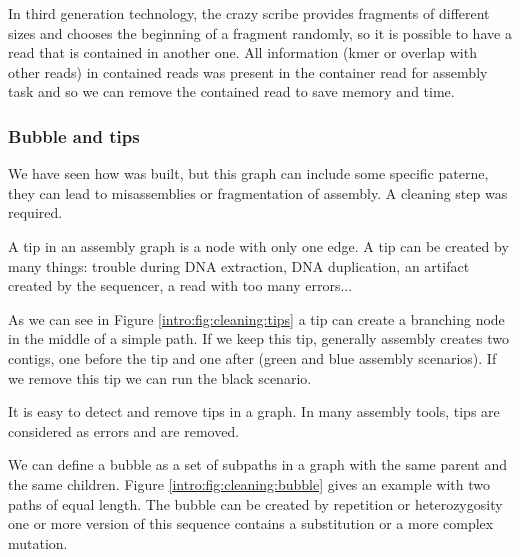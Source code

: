 \documentclass[main]{subfiles}
\begin{document}
In third generation technology, the crazy scribe provides fragments of different sizes and chooses the beginning of a fragment randomly, so it is possible to have a read that is contained in another one. All information (kmer or overlap with other reads) in contained reads was present in the container read for assembly task and so we can remove the contained read to save memory and time.

\subsubsection{Bubble and tips} \label{intro:subsubsec:bubble_tips}

We have seen how \OLC was built, but this graph can include some specific paterne, they can lead to misassemblies or fragmentation of assembly. A cleaning step was required.

\begin{figure}[ht]
    \caption{}
    \label{intro:fig:cleaning}
\end{figure}

A tip in an assembly graph is a node with only one edge. A tip can be created by many things: trouble during DNA extraction, DNA duplication, an artifact created by the sequencer, a read with too many errors...

As we can see in Figure \ref{intro:fig:cleaning:tips} a tip can create a branching node in the middle of a simple path. If we keep this tip, generally assembly creates two contigs, one before the tip and one after (green and blue assembly scenarios). If we remove this tip we can run the black scenario.

It is easy to detect and remove tips in a graph. In many assembly tools, tips are considered as errors and are removed.

We can define a bubble as a set of subpaths in a graph with the same parent and the same children. Figure \ref{intro:fig:cleaning:bubble} gives an example with two paths of equal length. The bubble can be created by repetition or heterozygosity  one or more version of this sequence contains a substitution or a more complex mutation.
\end{document}

